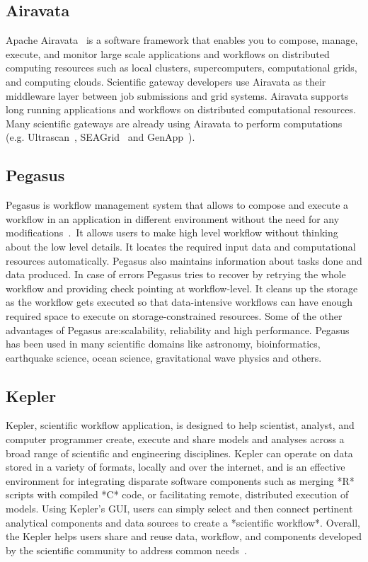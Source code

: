\subsection{Airavata}

Apache Airavata~\cite{www-airavata} is a software framework that
enables you to compose, manage, execute, and monitor large scale
applications and workflows on distributed computing resources such as
local clusters, supercomputers, computational grids, and computing
clouds. Scientific gateway developers use Airavata as their middleware
layer between job submissions and grid systems. Airavata supports long
running applications and workflows on distributed computational
resources. Many scientific gateways are already using Airavata to
perform computations (e.g. Ultrascan~\cite{www-ultrascan},
SEAGrid~\cite{www-seagrid} and GenApp~\cite{www-genapp}).

   \pv

\subsection{Pegasus}\label{S:pegasus}

Pegasus is workflow management system that allows to compose and
execute a workflow in an application in different environment without
the need for any modifications~\cite{www-Pegasus}. It allows users to
make high level workflow without thinking about the low level
details. It locates the required input data and computational
resources automatically.  Pegasus also maintains information about
tasks done and data produced. In case of errors Pegasus tries to
recover by retrying the whole workflow and providing check pointing at
workflow-level.  It cleans up the storage as the workflow gets
executed so that data-intensive workflows can have enough required
space to execute on storage-constrained resources. Some of the other
advantages of Pegasus are:scalability, reliability and high
performance. Pegasus has been used in many scientific domains like
astronomy, bioinformatics, earthquake science, ocean science,
gravitational wave physics and others.

   \pv


\subsection{Kepler}
 
Kepler, scientific workflow application, is designed to help
scientist, analyst, and computer programmer create, execute and share
models and analyses across a broad range of scientific and engineering
disciplines.  Kepler can operate on data stored in a variety of
formats, locally and over the internet, and is an effective
environment for integrating disparate software components such as
merging *R* scripts with compiled *C* code, or facilitating remote,
distributed execution of models. Using Kepler's GUI, users can simply
select and then connect pertinent analytical components and data
sources to create a *scientific workflow*. Overall, the Kepler helps
users share and reuse data, workflow, and components developed by the
scientific community to address common needs~\cite{www-kepler}.

